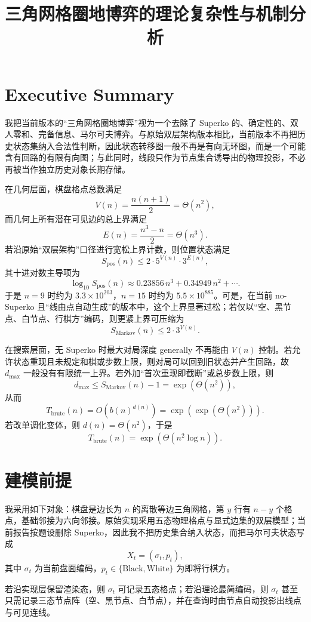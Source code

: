 \documentclass[12pt]{ctexart}
\title{三角网格圈地博弈的理论复杂性与机制分析}
\author{}
\date{}
\begin{document}
\maketitle

\section*{Executive Summary}

我把当前版本的“三角网格圈地博弈”视为一个去除了 Superko 的、确定性的、双人零和、完备信息、马尔可夫博弈。与原始双层架构版本相比，当前版本不再把历史状态集纳入合法性判断，因此状态转移图一般不再是有向无环图，而是一个可能含有回路的有限有向图；与此同时，线段只作为节点集合诱导出的物理投影，不必再被当作独立历史对象长期存储。

在几何层面，棋盘格点总数满足
\[
V(n)=\frac{n(n+1)}2=\Theta(n^2),
\]
而几何上所有潜在可见边的总上界满足
\[
E(n)=\frac{n^3-n}{2}=\Theta(n^3).
\]
若沿原始“双层架构”口径进行宽松上界计数，则位置状态满足
\[
S_{\mathrm{pos}}(n)\le 2\cdot 5^{V(n)}\cdot 3^{E(n)},
\]
其十进对数主导项为
\[
\log_{10} S_{\mathrm{pos}}(n)\approx 0.23856\,n^3+0.34949\,n^2+\cdots .
\]
于是 \(n=9\) 时约为 \(3.3\times 10^{203}\)，\(n=15\) 时约为 \(5.5\times 10^{885}\)。可是，在当前 no-Superko 且“线由点自动生成”的版本中，这个上界显著过松；若仅以“空、黑节点、白节点、行棋方”编码，则更紧上界可压缩为
\[
S_{\mathrm{Markov}}(n)\le 2\cdot 3^{V(n)}.
\]

在搜索层面，无 Superko 时最大对局深度 generally 不再能由 \(V(n)\) 控制。若允许状态重现且未规定和棋或步数上限，则对局可以回到旧状态并产生回路，故 \(d_{\max}\) 一般没有有限统一上界。若外加“首次重现即截断”或总步数上限，则
\[
d_{\max}\le S_{\mathrm{Markov}}(n)-1=\exp(\Theta(n^2)),
\]
从而
\[
T_{\mathrm{brute}}(n)=O(b(n)^{d(n)})=\exp(\exp(\Theta(n^2))).
\]
若改单调化变体，则 \(d(n)=\Theta(n^2)\)，于是
\[
T_{\mathrm{brute}}(n)=\exp(\Theta(n^2\log n)).
\]

\section*{建模前提}

我采用如下对象：棋盘是边长为 \(n\) 的离散等边三角网格，第 \(y\) 行有 \(n-y\) 个格点，基础邻接为六向邻接。原始实现采用五态物理格点与显式边集的双层模型；当前报告按题设删除 Superko，因此我不把历史集合纳入状态，而把马尔可夫状态写成
\[
X_t=(\sigma_t,p_t),
\]
其中 \(\sigma_t\) 为当前盘面编码，\(p_t\in\{\mathrm{Black},\mathrm{White}\}\) 为即将行棋方。

若沿实现层保留渲染态，则 \(\sigma_t\) 可记录五态格点；若沿理论最简编码，则 \(\sigma_t\) 甚至只需记录三态节点阵（空、黑节点、白节点），并在查询时由节点自动投影出线点与可见连线。
\end{document}
